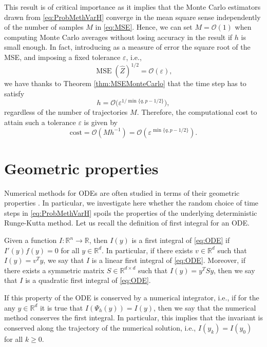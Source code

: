 \documentclass{siamart1116}
\numberwithin{theorem}{section}
\newcommand{\R}{\mathbb{R}}
\newcommand{\OO}{\mathcal{O}}
\newcommand{\epl}{\varepsilon}
\newcommand{\MSE}{\operatorname{MSE}}
\newcommand{\corr}[1]{{\color{bordeaux}#1}}
\begin{document}
\begin{remark} This result is of critical importance as it implies that the Monte Carlo estimators drawn from \eqref{eq:ProbMethVarH} converge in the mean square sense independently of the number of samples $M$ in \eqref{eq:MSE}. Hence, we can set $M = \OO(1)$ when computing Monte Carlo averages without losing accuracy in the result if $h$ is small enough. In fact, introducing as a measure of error the square root of the MSE, and imposing a fixed tolerance $\epl$, i.e.,
\begin{equation}
	\MSE(\hat Z)^{1/2} = \OO(\epl),
\end{equation}
we have thanks to Theorem \ref{thm:MSEMonteCarlo} that the time step has to satisfy
\begin{equation}
	h = \OO\big(\epl^{1 / \min\{q, p - 1/2\}}\big),
\end{equation}
regardless of the number of trajectories $M$. Therefore, the computational cost to attain such a tolerance $\epl$ is given by
\begin{equation}
	\mathrm{cost} = \OO(Mh^{-1}) = \OO(\epl^{\min\{q, p - 1/2\}}).
\end{equation}
\end{remark} 

\section{Geometric properties}\label{sec:GeomProperties}
Numerical methods for ODEs are often studied in terms of their geometric properties \cite{HLW06}. In particular, we investigate here whether the random choice of time steps in \eqref{eq:ProbMethVarH} spoils the properties of the underlying deterministic Runge-Kutta method. Let us recall the definition of first integral for an ODE.
\begin{definition} Given a function $I\colon\R^n\to\R$, then $I(y)$ is a first integral of \eqref{eq:ODE} if $I'(y)f(y) = 0$ for all $y \in \R^d$. In particular, if there exists $v \in \R^d$ such that $I(y) = v^Ty$, we say that $I$ is a linear first integral of \eqref{eq:ODE}. Moreover, if there exists a symmetric matrix $S \in \R^{d\times d}$ such that $I(y) = y^TSy$, then we say that $I$ is a quadratic first integral of \eqref{eq:ODE}.
\end{definition}
\corr{If this property of the ODE is conserved by a numerical integrator, i.e., if for the any $y\in\R^d$ it is true that $I(\Psi_h(y)) = I(y)$, then we say that the numerical method conserves the first integral. In particular, this implies that the invariant is conserved along the trajectory of the numerical solution, i.e., $I(y_k) = I(y_0)$ for all $k\geq 0$.}
	
\end{document}
